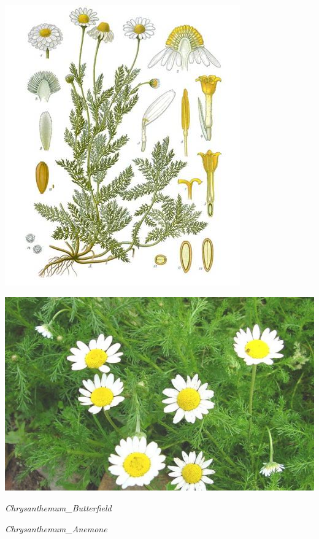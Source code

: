 \documentclass{article}
\begin{document}
\begin{center}
\includegraphics[width=0.9\textheight, angle=90]{../Chamomile.jpg}
\end{center}
\newpage

\begin{center}
\includegraphics[width=0.9\textheight, angle=90]{../chamomile2.jpg}
\end{center}
\newpage

\noindent   
\vfill
\centerline{{\Large\emph{Chrysanthemum_Butterfield}}}
\vfill
\newpage

\noindent   
\vfill
\centerline{{\Large\emph{Chrysanthemum_Anemone}}}
\vfill
\newpage
\end{document}

